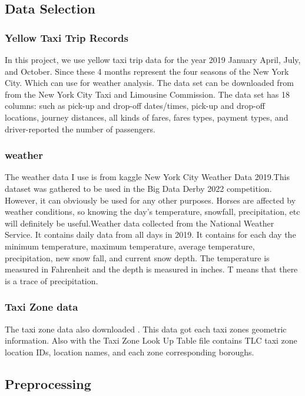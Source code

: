 \documentclass[11pt]{article}
\begin{document}
\subsection{Data Selection}

\subsubsection{Yellow Taxi Trip Records }
In this project, we use yellow taxi trip data for the year 2019 January April, July, and October. Since these 4 months represent the four seasons of the New York City. Which can use for weather analysis.  The data set can be downloaded from from the New York City Taxi and Limousine Commission. The data set has 18 columns: such as pick-up and drop-oﬀ dates/times, pick-up and drop-oﬀ locations, journey distances, all kinds of fares, fares types, payment types, and driver-reported the number of passengers. 


\subsubsection{weather}
The weather data I use is from kaggle New York City Weather Data 2019.This dataset was gathered to be used in the Big Data Derby 2022 competition. However, it can obviously be used for any other purposes. Horses are affected by weather conditions, so knowing the day's temperature, snowfall, precipitation, etc will definitely be useful.Weather data collected from the National Weather Service. It contains daily data from all days in 2019. It contains for each day the minimum temperature, maximum temperature, average temperature, precipitation, new snow fall, and current snow depth. The temperature is measured in Fahrenheit and the depth is measured in inches. T means that there is a trace of precipitation.\cite{kaggle}

\subsubsection{Taxi Zone data}
The taxi zone data also downloaded \cite{TaxiZone}. This data got each taxi zones geometric information. Also with the Taxi Zone Look Up Table file contains TLC taxi zone location IDs, location names, and each zone corresponding boroughs.

\subsection{Preprocessing}
\end{document}

